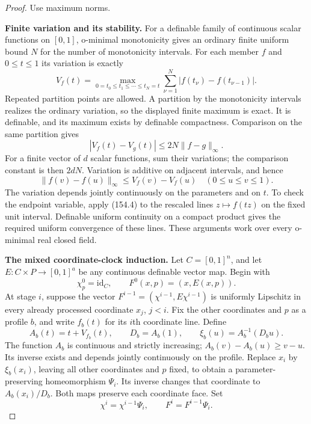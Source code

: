 \begin{proof}
Use maximum norms.

\textbf{Finite variation and its stability.}\quad
For a definable family of continuous scalar functions on
$[0,1]$, o-minimal monotonicity gives an ordinary finite
uniform bound $N$ for the number of monotonicity intervals.
For each member $f$ and $0\le t\le1$ its variation is exactly
\[
 V_f(t)=
 \max_{0=t_0\le t_1\le\cdots\le t_N=t}
       \sum_{\nu=1}^N|f(t_\nu)-f(t_{\nu-1})|.
 \tag{154.3}
\]
Repeated partition points are allowed. A partition by the
monotonicity intervals realizes the ordinary variation, so
the displayed finite maximum is exact. It is definable,
and its maximum exists by definable compactness. Comparison
on the same partition gives
\[
 |V_f(t)-V_g(t)|\le2N\|f-g\|_\infty.
 \tag{154.4}
\]
For a finite vector of $d$ scalar functions, sum their
variations; the comparison constant is then $2dN$.
Variation is additive on adjacent intervals, and hence
\[
 \|f(v)-f(u)\|_\infty\le V_f(v)-V_f(u)
 \quad(0\le u\le v\le1).
 \tag{154.5}
\]
The variation depends jointly continuously on the parameters
and on $t$. To check the endpoint variable, apply (154.4)
to the rescaled lines $z\mapsto f(tz)$ on the fixed unit
interval. Definable uniform continuity on a compact product
gives the required uniform convergence of these lines.
These arguments work over every o-minimal real closed field.

\textbf{The mixed coordinate-clock induction.}\quad
Let $C=[0,1]^n$, and let
$E:C\times P\to[0,1]^a$ be any continuous definable vector
map. Begin with
\[
 \chi^0_p=\mathrm{id}_C,\qquad
 F^0(x,p)=(x,E(x,p)).
\]
At stage $i$, suppose the vector
$F^{i-1}=(\chi^{i-1},E\chi^{i-1})$ is uniformly Lipschitz
in every already processed coordinate $x_j$, $j<i$.
Fix the other coordinates and $p$ as a profile $b$, and
write $f_b(t)$ for its $i$th coordinate line. Define
\[
 A_b(t)=t+V_{f_b}(t),\qquad
 D_b=A_b(1),\qquad
 \xi_b(u)=A_b^{-1}(D_bu).
 \tag{154.6}
\]
The function $A_b$ is continuous and strictly increasing;
$A_b(v)-A_b(u)\ge v-u$. Its inverse exists and depends
jointly continuously on the profile. Replace $x_i$ by
$\xi_b(x_i)$, leaving all other coordinates and $p$ fixed,
to obtain a parameter-preserving homeomorphism $\Psi_i$.
Its inverse changes that coordinate to $A_b(x_i)/D_b$.
Both maps preserve each coordinate face. Set
\[
 \chi^i=\chi^{i-1}\Psi_i,\qquad
 F^i=F^{i-1}\Psi_i.
\]


\end{proof}
